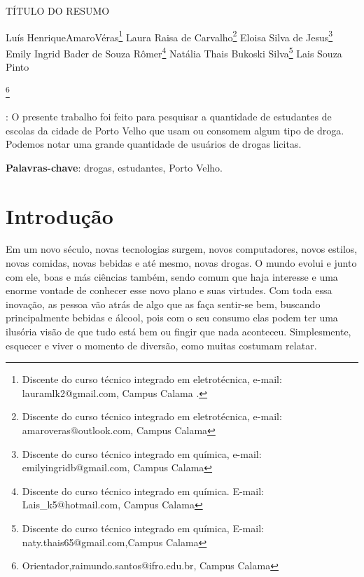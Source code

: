 \documentclass[article,12pt,onesidea,4paper,english,brazil]{abntex2}
\begin{document}
	
	
	\frenchspacing 
	
	\begin{center}
		\LARGE TÍTULO DO RESUMO
		
		\normalsize
	Luís HenriqueAmaroVéras\footnote{Discente do curso técnico integrado em eletrotécnica, e-mail: lauramlk2@gmail.com, Campus Calama .} 
	Laura Raisa de Carvalho\footnote{Discente do curso técnico integrado em eletrotécnica, e-mail: amaroveras@outlook.com, Campus Calama } 
	Eloisa Silva de Jesus\footnote{Discente do curso técnico integrado em química, e-mail: emilyingridb@gmail.com, Campus Calama } 
		Emily Ingrid Bader de Souza Rômer\footnote{Discente do curso técnico integrado em química. E-mail: Lais\_k5@hotmail.com, Campus Calama } 
	Natália Thais Bukoski Silva\footnote{Discente do curso técnico integrado em química, E-mail: naty.thais65@gmail.com,Campus Calama } 
	Lais Souza Pinto
	
	\footnote{Orientador,raimundo.santos@ifro.edu.br, Campus Calama} 
	\end{center}
	
	\begin{resumoumacoluna}
		: O presente trabalho foi feito para pesquisar a quantidade de estudantes  de escolas da cidade de Porto Velho que usam ou consomem algum tipo de droga. Podemos notar uma grande quantidade de usuários de drogas licitas.
		
		
		
		\vspace{\onelineskip}
		
		\noindent
		\textbf{Palavras-chave}: drogas, estudantes, Porto Velho.
	\end{resumoumacoluna}
	
	\section*{Introdução}
	
Em um novo século, novas tecnologias surgem, novos computadores, novos estilos, novas comidas, novas bebidas e até mesmo, novas drogas. O mundo evolui e junto com ele, boas e más ciências também, sendo comum que haja interesse e uma enorme vontade de conhecer esse novo plano e suas virtudes. Com toda essa inovação, as pessoa vão atrás de algo que as faça sentir-se bem, buscando principalmente bebidas e álcool, pois com o seu consumo elas podem ter uma ilusória visão de que tudo está bem ou fingir que nada aconteceu. Simplesmente, esquecer e viver o momento de diversão, como muitas costumam relatar.
\end{document}
